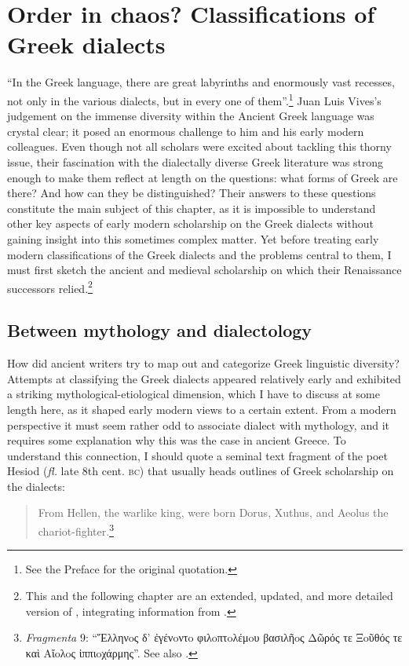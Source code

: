\chapter{Order in chaos? Classifications of Greek dialects}\label{chap:2}

“In the Greek language, there are great labyrinths and enormously vast recesses, not only in the various dialects, but in every one of them”.\footnote{See the Preface for the original quotation.} Juan Luis Vives’s judgement on the immense diversity within the Ancient Greek language was crystal clear; it posed an enormous challenge to him and his early modern colleagues. Even though not all scholars were excited about tackling this thorny issue, their fascination with the dialectally diverse Greek literature was strong enough to make them reflect at length on the questions: what forms of Greek are there? And how can they be distinguished? Their answers to these questions constitute the main subject of this chapter, as it is impossible to understand other key aspects of early modern scholarship on the Greek dialects without gaining insight into this sometimes complex matter. Yet before treating early modern classifications of the Greek dialects and the problems central to them, I must first sketch the ancient and medieval scholarship on which their Renaissance successors relied.\footnote{This and the following chapter are an extended, updated, and more detailed version of \citet{VanRooy2016a}, integrating information from \citet{VanRooy2018b}.}

\section{Between mythology and dialectology}\label{sec:2.1} 

How did ancient writers try to map out and categorize Greek linguistic diversity? Attempts at classifying the Greek dialects appeared relatively early and exhibited a striking mythological-etiological dimension, which I have to discuss at some length here, as it shaped early modern views to a certain extent. From a modern perspective it must seem rather odd to associate dialect with mythology, and it requires some explanation why this was the case in ancient Greece. To understand this connection, I should quote a seminal text fragment of the poet Hesiod (\textit{fl.} late 8th cent. \textsc{bc}) that usually heads outlines of Greek scholarship on the dialects:

\begin{quote}
From Hellen, the warlike king, were born  Dorus, Xuthus, and Aeolus the chariot-fighter.\footnote{\textit{Fragmenta} 9: “Ἕλληνoς δ’ ἐγένoντo φιλoπτoλέμoυ βασιλῆoς {\textbar} Δῶρός τε Ξoῦθός τε καὶ Aἴoλoς ἱππιoχάρμης”. See also \citet[64]{Hainsworth1967}.}
\end{quote}


